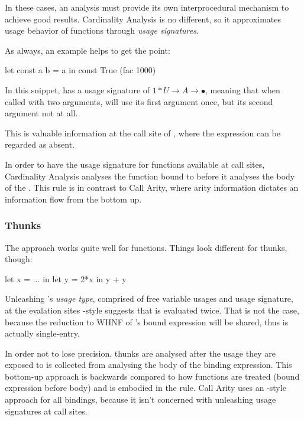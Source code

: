 In these cases, an analysis must provide its own interprocedural mechanism to achieve good results.
Cardinality Analysis is no different, so it approximates usage behavior of functions through \emph{usage signatures}.

As always, an example helps to get the point:
\begin{haskellcode}
  let const a b = a
  in const True (fac 1000) 
\end{haskellcode}

In this snippet,  has a usage signature of $1*U \to A \to \bullet$, meaning that when called with two arguments,  will use its first argument once, but its second argument not at all.

This is valuable information at the call site of , where the expression  can be regarded as absent.

In order to have the usage signature for functions available at call sites, Cardinality Analysis analyses the function bound to  before it analyses the body of the .
This  rule \parencite{card} is in contrast to Call Arity, where arity information dictates an information flow from the bottom up.

\subsubsection{Thunks}

The  approach works quite well for functions.
Things look different for thunks, though:
\begin{haskellcode}
  let x = ...
  in let y = 2*x
     in y + y
\end{haskellcode}

Unleashing 's \emph{usage type}, comprised of free variable usages and usage signature, at the evalation sites -style suggests that  is evaluated twice.
That is not the case, because the reduction to WHNF of 's bound expression will be shared, thus  is actually single-entry.

In order not to lose precision, thunks are analysed after the usage they are exposed to is collected from analysing the body of the binding  expression.
This bottom-up approach is backwards compared to how functions are treated (\eg bound expression before body) and is embodied in the  rule.
Call Arity uses an -style approach for all bindings, because it isn't concerned with unleashing usage signatures at call sites.

